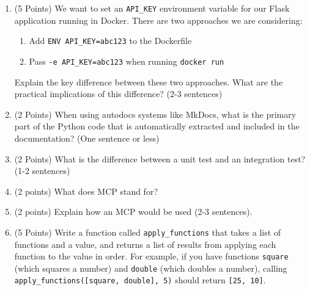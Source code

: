 \documentclass[11pt]{article}
\begin{document}
\begin{enumerate}
\vspace{6cm}



\item (5 Points) We want to set an \texttt{API\_KEY} environment variable for our Flask application running in Docker. There are two approaches we are considering:

\begin{enumerate}
\item Add \texttt{ENV API\_KEY=abc123} to the Dockerfile
\item Pass \texttt{-e API\_KEY=abc123} when running \texttt{docker run}
\end{enumerate}

Explain the key difference between these two approaches. What are the practical implications of this difference? (2-3 sentences)

\vspace{3cm}

\item (2 Points) When using autodocs systems like MkDocs, what is the primary part of the Python code that is automatically extracted and included in the documentation? (One sentence or less)

\vspace{2cm}


\item (2 Points) What is the difference between a unit test and an integration test? (1-2 sentences)

\vspace{2cm}

\item (2 points) What does MCP stand for?
\vspace{2cm}

\item (2 points) Explain how an MCP would be used (2-3 sentences).
\vspace{3cm}


\item (5 Points) Write a function called \texttt{apply\_functions} that takes a list of functions and a value, and returns a list of results from applying each function to the value in order. For example, if you have functions \texttt{square} (which squares a number) and \texttt{double} (which doubles a number), calling \texttt{apply\_functions([square, double], 5)} should return \texttt{[25, 10]}.

\vspace{6cm}


\end{enumerate}
\end{document}

